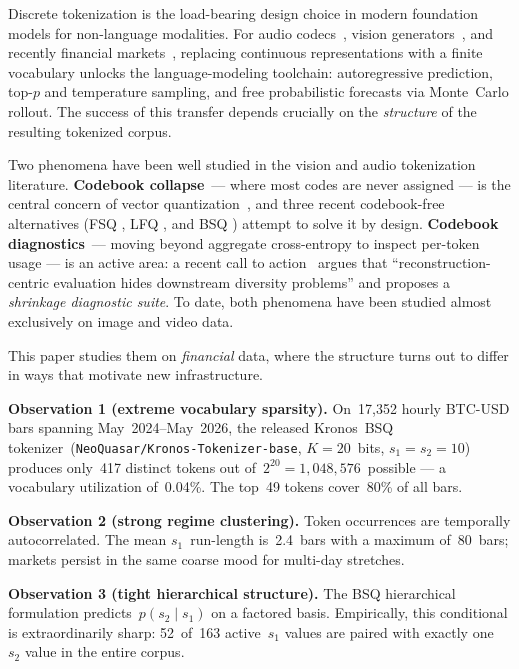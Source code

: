 \documentclass[10pt]{article}
\begin{document}
Discrete tokenization is the load-bearing design choice in modern
foundation models for non-language modalities. For audio
codecs~\citep{rvq_audio2024}, vision generators~\citep{lfq2024}, and
recently financial markets~\citep{kronos2025}, replacing continuous
representations with a finite vocabulary unlocks the language-modeling
toolchain: autoregressive prediction, top-$p$ and temperature
sampling, and free probabilistic forecasts via Monte~Carlo
rollout. The success of this transfer depends crucially on the
\emph{structure} of the resulting tokenized corpus.

Two phenomena have been well studied in the vision and audio
tokenization literature. \textbf{Codebook collapse}~--- where most
codes are never assigned --- is the central concern of vector
quantization~\citep{vqvae2017}, and three recent codebook-free
alternatives (FSQ \citealp{fsq2024}, LFQ \citealp{lfq2024}, and
BSQ \citealp{bsq2024}) attempt to solve it by
design. \textbf{Codebook diagnostics}~--- moving beyond aggregate
cross-entropy to inspect per-token usage --- is an active area: a
recent call to action~\citep{shrinks_codebook2026} argues that
``reconstruction-centric evaluation hides downstream diversity
problems'' and proposes a \emph{shrinkage diagnostic suite}. To
date, both phenomena have been studied almost exclusively on image
and video data.

This paper studies them on \emph{financial} data, where the structure
turns out to differ in ways that motivate new infrastructure.

\textbf{Observation 1 (extreme vocabulary sparsity).}
On~17{,}352 hourly BTC-USD bars spanning May~2024--May~2026, the
released Kronos~BSQ tokenizer~(\texttt{NeoQuasar/Kronos-Tokenizer-base},
$K=20$~bits, $s_1=s_2=10$) produces only~417 distinct tokens out
of~$2^{20}=1{,}048{,}576$~possible --- a vocabulary utilization
of~0.04\%. The top~49 tokens cover~80\% of all bars.

\textbf{Observation 2 (strong regime clustering).}
Token occurrences are temporally autocorrelated. The mean
$s_1$~run-length is~2.4~bars with a maximum of~80~bars; markets
persist in the same coarse mood for multi-day stretches.

\textbf{Observation 3 (tight hierarchical structure).}
The BSQ hierarchical formulation predicts~$p(s_2 \mid s_1)$ on a
factored basis. Empirically, this conditional is extraordinarily
sharp: 52~of~163 active~$s_1$ values are paired with exactly
one~$s_2$ value in the entire corpus.
\end{document}
